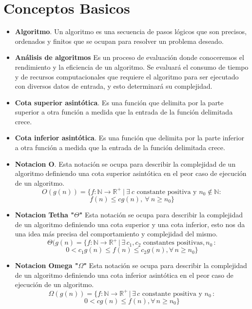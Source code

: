 \documentclass[12pt,twoside]{article}
\begin{document}
\newpage
\section{Conceptos Basicos}

\begin{itemize}
\item \textbf{Algoritmo}. Un algoritmo es una secuencia de pasos lógicos que son precisos, ordenados y finitos que se ocupan para resolver un problema deseado\cite{concep1}.

\item \textbf{Análisis de  algoritmos}
Es un proceso de evaluación donde conoceremos el rendimiento y la eficiencia de un algoritmo. Se evaluará el consumo de tiempo y de recursos computacionales que requiere el algoritmo para ser ejecutado con diversos datos de entrada, y esto determinará su complejidad\cite{concep1}.

\item \textbf{Cota superior asintótica}. Es una función que delimita por la parte superior a otra función a medida que la entrada de la función delimitada crece.

\item \textbf{Cota inferior asintótica}. Es una función que delimita por la parte inferior a otra función a medida que la entrada de la función delimitada crece.

\item \textbf{Notacion O}. Esta notación se ocupa para describir la complejidad de un algoritmo definiendo una cota superior asintótica en el peor caso de ejecución de un algoritmo\cite{concep1}.
\\
\[O(g(n)) = \{ f : \mathbb{N} \rightarrow \mathbb{R}^+ \ | \ \exists \ c \text{ constante positiva y } n_0 \notin \mathbb{N} :\] 
\[f(n) \leq cg(n), \ \forall \ n \geq n_0 \}\]

\item \textbf{Notacion Tetha "$\Theta$"} Esta notación se ocupa para describir la complejidad de un algoritmo definiendo una cota superior y una cota inferior, esto nos da una idea más precisa del comportamiento y complejidad del mismo\cite{concep1}.
\\
\[\Theta(g(n) = \{f : \mathbb{N} \rightarrow \mathbb{R}^+ \,|\, \exists \, c_1, c_2 \text{ constantes positivas}, n_0 \,: \]
\[0 < c_1g(n) \leq f(n) \leq c_2g(n), \forall \, n \geq n_0\}\]

\item \textbf{Notacion Omega "$\Omega$"}  Esta notación se ocupa para describir la complejidad de un algoritmo definiendo una cota inferior asintótica en el peor caso de ejecución de un algoritmo\cite{concep1}.
\\
\[\Omega(g(n)) = \{f : \mathbb{N} \rightarrow \mathbb{R}^+ \,|\, \exists \, c \text{ constante positiva y } n_0 \,:\]
\[0 < cg(n) \leq f(n), \forall \, n \geq n_0\}\]



\end{itemize}
\end{document}
